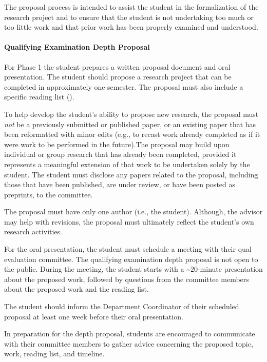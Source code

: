 The proposal process is intended to assist the student in the formalization of
the research project and to ensure that the student is not undertaking too much
or too little work and that prior work has been properly examined and
understood.

\hypertarget{qualifying-examination-depth-proposal}{
\paragraph{Qualifying Examination Depth Proposal}
\label{qualifying-examination-depth-proposal}
}

For Phase 1 the student prepares a written proposal document and oral presentation.
The student should propose a research project that can be completed in approximately one semester.
The proposal must also include a specific reading list ().

To help develop the student's ability to propose new research, the proposal must
\emph{not} be a previously submitted or published paper, or an existing paper
that has been reformatted with minor edits (e.g., to recast work already
completed as if it were work to be performed in the future).The proposal may
build upon individual or group research that has already been completed,
provided it represents a meaningful extension of that work to be undertaken
solely by the student. The student must disclose any papers related to the
proposal, including those that have been published, are under review, or have
been posted as preprints, to the committee.

The proposal must have only one author (i.e., the student).
Although, the advisor may help with revisions, the proposal must
ultimately reflect the student's own research activities.

For the oral presentation, the student must schedule a meeting with their qual
evaluation committee. The qualifying examination depth proposal is not open to
the public. During the meeting, the student starts with
a \textasciitilde20-minute presentation about the proposed work, followed by
questions from the committee members about the proposed work and the reading
list.

The student should inform the Department Coordinator of their scheduled proposal
at least one week before their oral presentation.

In preparation for the depth proposal, students are encouraged to communicate
with their committee members to gather advice concerning the proposed topic,
work, reading list, and timeline.

